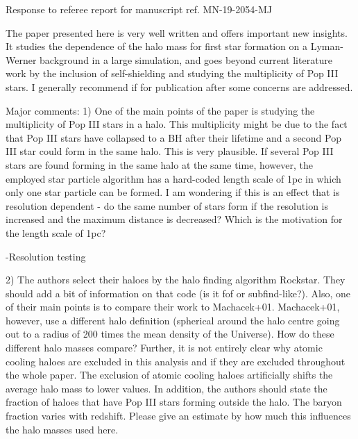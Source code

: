\documentclass[11pt]{article}
\begin{document}
\begin{center} 
\bfseries{
\begin{large}
  Response to referee report for manuscript ref. MN-19-2054-MJ
\end{large}
}
\end{center}

\begin{referee}
The paper presented here is very well written and offers important new insights. It studies the dependence of the halo mass for first star formation on a Lyman-Werner background in a large simulation, and goes beyond current literature work by the inclusion of self-shielding and studying the multiplicity of Pop III stars. I generally recommend if for publication after some concerns are addressed.
\end{referee}


\begin{referee}
Major comments:
1) One of the main points of the paper is studying the multiplicity of Pop III stars in a halo. This multiplicity might be due to the fact that Pop III stars have collapsed to a BH after their lifetime and a second Pop III star could form in the same halo. This is very plausible. If several Pop III stars are found forming in the same halo at the same time, however, the employed star particle algorithm has a hard-coded length scale of 1pc in which only one star particle can be formed. I am wondering if this is an effect that is resolution dependent - do the same number of stars form if the resolution is increased and the maximum distance is decreased? Which is the motivation for the length scale of 1pc?
\end{referee}

-Resolution testing



\begin{referee}
2) The authors select their haloes by the halo finding algorithm Rockstar. They should add a bit of information on that code (is it fof or subfind-like?). Also, one of their main points is to compare their work to Machacek+01. Machacek+01, however, use a different halo definition (spherical around the halo centre going out to a radius of 200 times the mean density of the Universe). How do these different halo masses compare?
Further, it is not entirely clear why atomic cooling haloes are excluded in this analysis and if they are excluded throughout the whole paper. The exclusion of atomic cooling haloes artificially shifts the average halo mass to lower values.
In addition, the authors should state the fraction of haloes that have Pop III stars forming outside the halo.
The baryon fraction varies with redshift. Please give an estimate by how much this influences the halo masses used here.
\end{referee}
\end{document}
